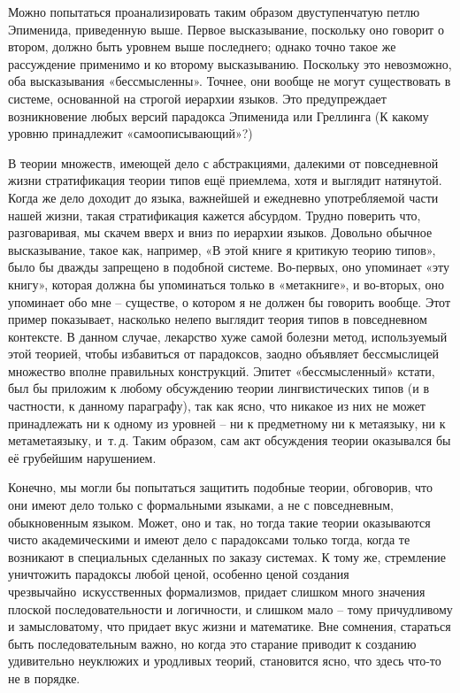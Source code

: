 \documentclass[../main.tex]{subfiles}
\begin{document}
Можно попытаться проанализировать таким образом двуступенчатую петлю Эпименида, приведенную выше. Первое высказывание, поскольку оно говорит о втором, должно быть уровнем выше последнего; однако точно такое же рассуждение применимо и ко второму высказыванию. Поскольку это невозможно, оба высказывания «бессмысленны». Точнее, они вообще не могут существовать в системе, основанной на строгой иерархии языков. Это предупреждает возникновение любых версий парадокса Эпименида или Греллинга (К какому уровню принадлежит «самоописывающий»?)

В теории множеств, имеющей дело с абстракциями, далекими от повседневной жизни стратификация теории типов ещё приемлема, хотя и выглядит натянутой. Когда же дело доходит до языка, важнейшей и ежедневно употребляемой части нашей жизни, такая стратификация кажется абсурдом. Трудно поверить что, разговаривая, мы скачем вверх и вниз по иерархии языков. Довольно обычное высказывание, такое как, например, «В этой книге я критикую теорию типов», было бы дважды запрещено в подобной системе. Во-первых, оно упоминает «эту книгу», которая должна бы упоминаться только в «метакниге», и во-вторых, оно упоминает обо мне \--- существе, о котором я не должен бы говорить вообще. Этот пример показывает, насколько нелепо выглядит теория типов в повседневном контексте. В данном случае, лекарство хуже самой болезни метод, используемый этой теорией, чтобы избавиться от парадоксов, заодно объявляет бессмыслицей множество вполне правильных конструкций. Эпитет «бессмысленный» кстати, был бы приложим к любому обсуждению теории лингвистических типов (и в частности, к данному параграфу), так как ясно, что никакое из них не может принадлежать ни к одному из уровней \--- ни к предметному ни к метаязыку, ни к метаметаязыку, и~т.\,д. Таким образом, сам акт обсуждения теории оказывался бы её грубейшим нарушением.

Конечно, мы могли бы попытаться защитить подобные теории, обговорив, что они имеют дело только с формальными языками, а не с повседневным, обыкновенным языком. Может, оно и так, но тогда такие теории оказываются чисто академическими и имеют дело с парадоксами только тогда, когда те возникают в специальных сделанных по заказу системах. К тому же, стремление уничтожить парадоксы любой ценой, особенно ценой создания чрезвычайно~искусственных формализмов, придает слишком много значения плоской последовательности и логичности, и слишком мало \--- тому причудливому и замысловатому, что придает вкус жизни и математике. Вне сомнения, стараться быть последовательным важно, но когда это старание приводит к созданию удивительно неуклюжих и уродливых теорий, становится ясно, что здесь что-то не в порядке.
\end{document}
